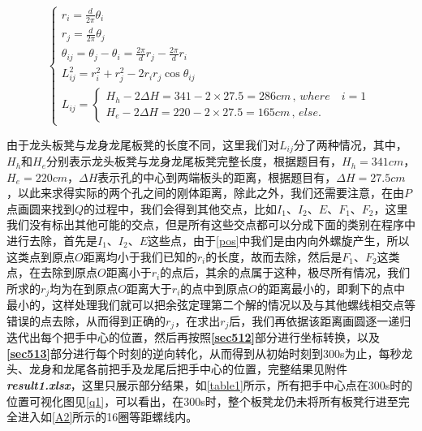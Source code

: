 \documentclass[withoutpreface,bwprint]{cumcmthesis} %
\begin{document}
\begin{equation}
\begin{cases}
    r_i = \frac{d}{2\pi}\theta_i\\
    r_j = \frac{d}{2\pi}\theta_j\\
    \theta_{ij} = \theta_j - \theta_i = \frac{2\pi}{d}r_j - \frac{2\pi}{d}r_i\\
    L^2_{ij} = r^2_i + r^2_j - 2r_i r_j\cos{\theta_{ij}}\\
    L_{ij} = 
    \begin{cases}
        H_h - 2\Delta H = 341 - 2\times 27.5 = 286cm\,,\, where\quad i = 1\\
        H_e - 2\Delta H = 220 - 2\times 27.5 = 165cm\,,\, else.
    \end{cases}
\end{cases}
\label{eq11}
\end{equation}

由于龙头板凳与龙身龙尾板凳的长度不同，这里我们对$L_{ij}$分了两种情况，其中，$H_h$和$H_e$分别表示龙头板凳与龙身龙尾板凳完整长度，根据题目有，$H_h = 341cm$，$H_e = 220cm$，$\Delta H$表示孔的中心到两端板头的距离，根据题目有，$\Delta H = 27.5cm$，以此来求得实际的两个孔之间的刚体距离，除此之外，我们还需要注意，在由$P$点画圆来找到$Q$的过程中，我们会得到其他交点，比如$I_1$、$I_2$、$E$、$F_1$、$F_2$，这里我们没有标出其他可能的交点，但是所有这些交点都可以分成下面的类别在程序中进行去除，首先是$I_1$、$I_2$、$E$这些点，由于\cref{pos}中我们是由内向外螺旋产生，所以这类点到原点$O$距离均小于我们已知的$r_i$的长度，故而去除，然后是$F_1$、$F_2$这类点，在去除到原点$O$距离小于$r_i$的点后，其余的点属于这种，极尽所有情况，我们所求的$r_j$均为在到原点$O$距离大于$r_i$的点中到原点$O$的距离最小的，即剩下的点中最小的，这样处理我们就可以把余弦定理第二个解的情况以及与其他螺线相交点等错误的点去除，从而得到正确的$r_j$，在求出$r_j$后，我们再依据该距离画圆逐一递归迭代出每个把手中心的位置，然后再按照\textbf{\ref{sec512}}部分进行坐标转换，以及\textbf{\ref{sec513}}部分进行每个时刻的逆向转化，从而得到从初始时刻到300s为止，每秒龙头、龙身和龙尾各前把手及龙尾后把手中心的位置，完整结果见附件\textbf{\textit{result1.xlsx}}，这里只展示部分结果，如\cref{table1}所示，所有把手中心点在300s时的位置可视化图见\cref{q1}，可以看出，在300s时，整个板凳龙仍未将所有板凳行进至完全进入如\cref{A2}所示的16圈等距螺线内。
\end{document}

